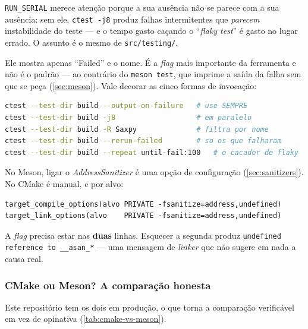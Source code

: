 \texttt{RUN\_SERIAL} merece atenção porque a sua ausência não se parece com a
sua ausência: sem ele, \texttt{ctest -j8} produz falhas intermitentes que
\emph{parecem} instabilidade do teste --- e o tempo gasto caçando o
``\emph{flaky test}'' é gasto no lugar errado. O assunto é o mesmo de
\texttt{src/testing/}.

\begin{armadilha}
Ele mostra apenas ``Failed'' e o nome. É a \emph{flag} mais importante da
ferramenta e não é o padrão --- ao contrário do \texttt{meson test}, que imprime
a saída da falha sem que se peça (\cref{sec:meson}). Vale decorar as cinco
formas de invocação:
\begin{lstlisting}[style=bt, language=bash, frame=none,
                   xleftmargin=0pt, xrightmargin=0pt]
ctest --test-dir build --output-on-failure   # use SEMPRE
ctest --test-dir build -j8                   # em paralelo
ctest --test-dir build -R Saxpy              # filtra por nome
ctest --test-dir build --rerun-failed        # so os que falharam
ctest --test-dir build --repeat until-fail:100   # o cacador de flaky
\end{lstlisting}
\end{armadilha}

\begin{armadilha}
No Meson, ligar o \emph{AddressSanitizer} é uma opção de configuração
(\cref{sec:sanitizers}). No CMake é manual, e por alvo:
\begin{lstlisting}[style=bt, language=Meson, frame=none,
                   morekeywords={target_compile_options,target_link_options,PRIVATE},
                   xleftmargin=0pt, xrightmargin=0pt]
target_compile_options(alvo PRIVATE -fsanitize=address,undefined)
target_link_options(alvo    PRIVATE -fsanitize=address,undefined)
\end{lstlisting}
A \emph{flag} precisa estar nas \textbf{duas} linhas. Esquecer a segunda produz
\texttt{undefined reference to \_\_asan\_*} --- uma mensagem de \emph{linker}
que não sugere em nada a causa real.
\end{armadilha}

\subsubsection{CMake ou Meson? A comparação honesta}

Este repositório tem os dois em produção, o que torna a comparação verificável
em vez de opinativa (\cref{tab:cmake-vs-meson}).

